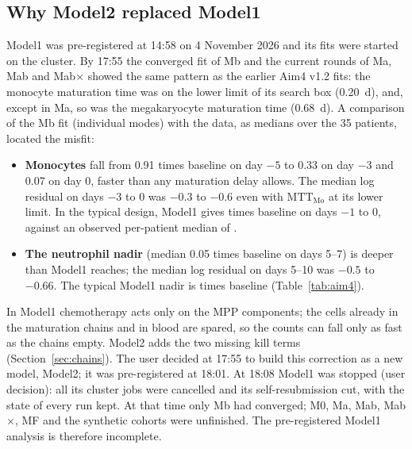 \documentclass[11pt]{article}
\begin{document}
\subsection{Why Model2 replaced Model1}\label{sec:why}
Model1 was pre-registered at 14:58 on 4 November 2026 and its fits were started on the cluster. By 17:55 the converged fit of Mb and the current rounds of Ma, Mab and Mab$\times$ showed the same pattern as the earlier Aim4 v1.2 fits: the monocyte maturation time was on the lower limit of its search box (0.20~d), and, except in Ma, so was the megakaryocyte maturation time (0.68~d). A comparison of the Mb fit (individual modes) with the data, as medians over the 35 patients, located the misfit:
\begin{itemize}
\item \textbf{Monocytes} fall from 0.91 times baseline on day $-5$ to 0.33 on day $-3$ and 0.07 on day 0, faster than any maturation delay allows. The median log residual on days $-3$ to 0 was $-0.3$ to $-0.6$ even with $\mathrm{MTT}_{\mathrm{Mo}}$ at its lower limit. In the typical design, Model1 gives \valAmcLdModelOne{} times baseline on days $-1$ to 0, against an observed per-patient median of \valAmcTarget.
\item \textbf{The neutrophil nadir} (median 0.05 times baseline on days 5--7) is deeper than Model1 reaches; the median log residual on days 5--10 was $-0.5$ to $-0.66$. The typical Model1 nadir is \valAncNadirModelOne{} times baseline (Table~\ref{tab:aim4}).
\end{itemize}
In Model1 chemotherapy acts only on the MPP components; the cells already in the maturation chains and in blood are spared, so the counts can fall only as fast as the chains empty. Model2 adds the two missing kill terms (Section~\ref{sec:chains}). The user decided at 17:55 to build this correction as a new model, Model2; it was pre-registered at 18:01. At 18:08 Model1 was stopped (user decision): all its cluster jobs were cancelled and its self-resubmission cut, with the state of every run kept. At that time only Mb had converged; M0, Ma, Mab, Mab$\times$, MF and the synthetic cohorts were unfinished. The pre-registered Model1 analysis is therefore incomplete.
\end{document}
